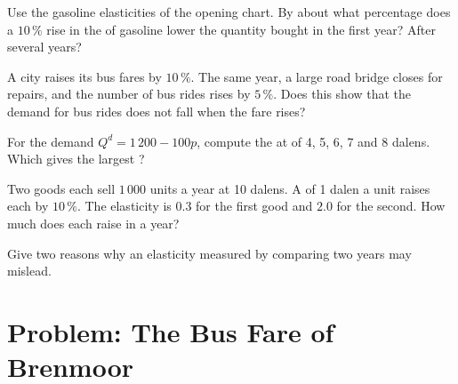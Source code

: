 \begin{exercise}[$\star\star$]\label{exo:g9:elasticity-first-look:8}
Use the gasoline elasticities of the opening chart. By about what percentage does a $10\,\%$ rise in the
 of gasoline lower the quantity bought in the first year? After several years?
\end{exercise}

\begin{exercise}[$\star\star$]\label{exo:g9:elasticity-first-look:9}
A city raises its bus fares by $10\,\%$. The same year, a large road bridge closes for repairs, and the
number of bus rides rises by $5\,\%$. Does this show that the demand for bus rides does not fall when the
fare rises?
\end{exercise}

\begin{exercise}[$\star\star\star$]\label{exo:g9:elasticity-first-look:10}
For the demand $Q^d = 1\,200 - 100p$, compute the  at  of 4, 5, 6, 7 and 8 dalens. Which
 gives the largest ?
\end{exercise}

\begin{exercise}[$\star\star\star$]\label{exo:g9:elasticity-first-look:11}
Two goods each sell $1\,000$ units a year at 10 dalens. A  of 1 dalen a unit raises each  by
$10\,\%$. The elasticity is $0.3$ for the first good and $2.0$ for the second. How much  does each raise
in a year?
\end{exercise}

\begin{exercise}[$\star\star\star$]\label{exo:g9:elasticity-first-look:12}
Give two reasons why an elasticity measured by comparing two years may mislead.
\end{exercise}

\section{Problem: The Bus Fare of Brenmoor}

